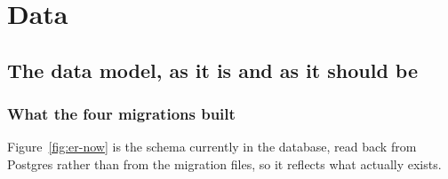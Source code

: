 \part{Data}

\chapter{The data model, as it is and as it should be}
\label{ch:datamodel}

\section{What the four migrations built}

Figure~\ref{fig:er-now} is the schema currently in the database, read back from Postgres rather
than from the migration files, so it reflects what actually exists.

